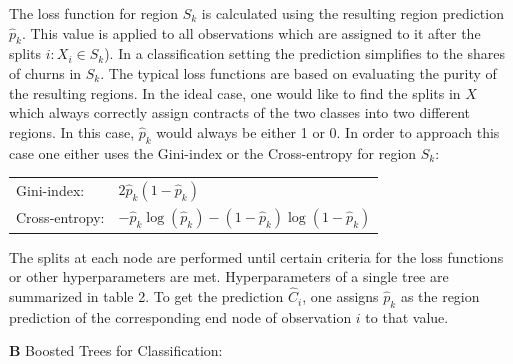 \documentclass[12pt,titlepage]{article}
\begin{document}
\noindent
The loss function for region $S_{k}$ is calculated using the resulting region prediction $\hat{p}_{k}$. This value is applied to all observations which are assigned to it after the splits $i:X_{i}\in S_{k}$). In a classification setting the prediction simplifies to the shares of churns in $S_{k}$. The typical loss functions are based on evaluating the purity of the resulting regions. In the ideal case, one would like to find the splits in $X$ which always correctly assign contracts of the two classes into two different regions. In this case, $\hat{p}_{k}$ would always be either 1 or 0. In order to approach this case one either uses the Gini-index or the Cross-entropy for region $S_{k}$:
\vspace{5mm}
\begin{center}
    \begin{tabular}{ll}
        Gini-index: & $2\hat{p}_{k}(1-\hat{p}_{k})$ \\
        Cross-entropy: & $-\hat{p}_{k}\log(\hat{p}_{k}) - (1-\hat{p}_{k})\log(1-\hat{p}_{k})$ \\
    \end{tabular}
    \label{purity}
\end{center}
\vspace{5mm}
\noindent
The splits at each node are performed until certain criteria for the loss functions or other hyperparameters are met. Hyperparameters of a single tree are summarized in table 2. To get the prediction $\hat{C}_{i}$, one assigns $\hat{p}_{k}$ as the region prediction of the corresponding end node of observation $i$ to that value. \\
\vspace{6mm}
\indent

\textbf{B} Boosted Trees for Classification: \\
\end{document}
